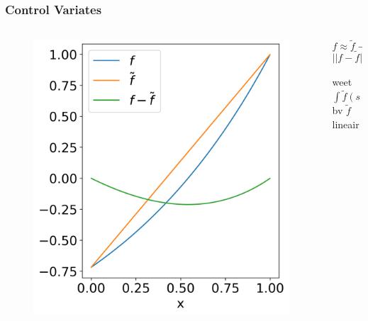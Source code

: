 \documentclass[20pt]{beamer}
\begin{document}
\begin{frame}
    \frametitle{Control Variates}

    \begin{columns}[t]
        \begin{column}{0.55\textwidth}
            \vspace*{-2cm}
            \begin{figure}[h]
                \includegraphics[height=0.8\textheight]{"imgs/control_variate.png"}
            \end{figure}
        \end{column}
        \begin{column}{0.45\textwidth}
            \pause
            \[
                f  \approx \tilde{f} \rightarrow
            \]\pause
            \vspace*{-1cm}
            \[
                ||f-\tilde{f}||_{2} \le ||f||_{2}
            \]
            \pause
            \vspace*{-1cm}
            \begin{center}
                weet $\int \tilde{f}(s)ds$ \\
                bv $\tilde{f}$ lineair
            \end{center}

        \end{column}
    \end{columns}

\end{frame}
\end{document}
